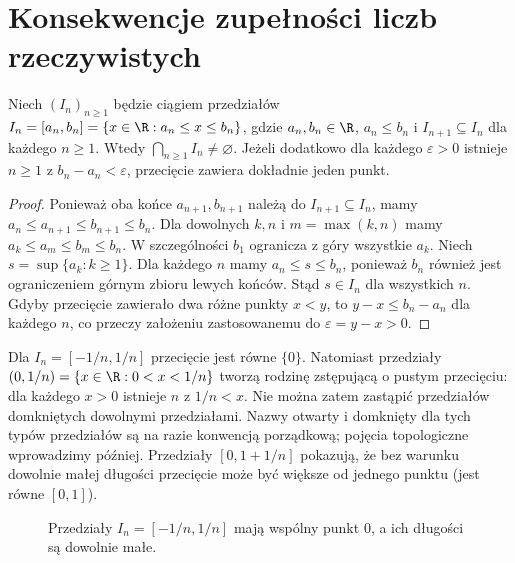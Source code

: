 \section{Konsekwencje zupełności liczb rzeczywistych}
\begin{twierdzenie}
\label{ma1:thm:nested-intervals}
Niech $(I_n)_{n\ge1}$ będzie ciągiem przedziałów $I_n=[a_n,b_n]=\{x\in\R:a_n\le x\le b_n\}$, gdzie $a_n,b_n\in\R$, $a_n\le b_n$ i $I_{n+1}\subseteq I_n$ dla każdego $n\ge1$. Wtedy $\bigcap_{n\ge1}I_n\ne\varnothing$. Jeżeli dodatkowo dla każdego $\varepsilon>0$ istnieje $n\ge1$ z $b_n-a_n<\varepsilon$, przecięcie zawiera dokładnie jeden punkt.
\end{twierdzenie}
\begin{proof}
Ponieważ oba końce $a_{n+1},b_{n+1}$ należą do $I_{n+1}\subseteq I_n$, mamy $a_n\le a_{n+1}\le b_{n+1}\le b_n$. Dla dowolnych $k,n$ i $m=\max(k,n)$ mamy $a_k\le a_m\le b_m\le b_n$. W szczególności $b_1$ ogranicza z góry wszystkie $a_k$. Niech $s=\sup\{a_k:k\ge1\}$. Dla każdego $n$ mamy $a_n\le s\le b_n$, ponieważ $b_n$ również jest ograniczeniem górnym zbioru lewych końców. Stąd $s\in I_n$ dla wszystkich $n$.
Gdyby przecięcie zawierało dwa różne punkty $x<y$, to $y-x\le b_n-a_n$ dla każdego $n$, co przeczy założeniu zastosowanemu do $\varepsilon=y-x>0$.
\end{proof}
\begin{przyklad}
Dla $I_n=[-1/n,1/n]$ przecięcie jest równe $\{0\}$. Natomiast przedziały $(0,1/n)=\{x\in\R:0<x<1/n\}$ tworzą rodzinę zstępującą o pustym przecięciu: dla każdego $x>0$ istnieje $n$ z $1/n<x$. Nie można zatem zastąpić przedziałów domkniętych dowolnymi przedziałami. Nazwy otwarty i domknięty dla tych typów przedziałów są na razie konwencją porządkową; pojęcia topologiczne wprowadzimy później. Przedziały $[0,1+1/n]$ pokazują, że bez warunku dowolnie małej długości przecięcie może być większe od jednego punktu (jest równe $[0,1]$).
\end{przyklad}

\begin{figure}[htbp]
\centering
{}
\caption{Przedziały $I_n=[-1/n,1/n]$ mają wspólny punkt $0$, a ich długości są dowolnie małe.}
\label{ma1:fig:nested-intervals}
\end{figure}

